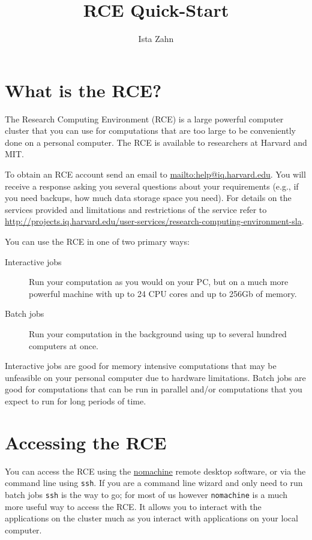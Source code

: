 \documentclass[11pt]{article}
\author{Ista Zahn}
\date{}
\title{RCE Quick-Start}
\begin{document}
\maketitle
\tableofcontents


\section{What is the RCE?}
\label{sec:org32671a0}
The Research Computing Environment (RCE) is a large powerful computer cluster that you can use for computations that are too large to be conveniently done on a personal computer. The RCE is available to researchers at Harvard and MIT. 

To obtain an RCE account send an email to \url{mailto:help@iq.harvard.edu}. You will receive a response asking you several questions about your requirements (e.g., if you need backups, how much data storage space you need). For details on the services provided and limitations and restrictions of the service refer to \url{http://projects.iq.harvard.edu/user-services/research-computing-environment-sla}.

You can use the RCE in one of two primary ways:
\begin{description}
\item[{Interactive jobs}] Run your computation as you would on your PC, but on a much more powerful machine with up to 24 CPU cores and up to 256Gb of memory.
\item[{Batch jobs}] Run your computation in the background using up to several hundred computers at once.
\end{description}

Interactive jobs are good for memory intensive computations that may be unfeasible on your personal computer due to hardware limitations. Batch jobs are good for computations that can be run in parallel and/or computations that you expect to run for long periods of time.

\section{Accessing the RCE}
\label{sec:org16009a6}
You can access the RCE using the \href{http://projects.iq.harvard.edu/rce/nx4\_installation}{nomachine} remote desktop software, or via the command line using \texttt{ssh}. If you are a command line wizard and only need to run batch jobs \texttt{ssh} is the way to go; for most of us however \texttt{nomachine} is a much more useful way to access the RCE. It allows you to interact with the applications on the cluster much as you interact with applications on your local computer. 
\end{document}
